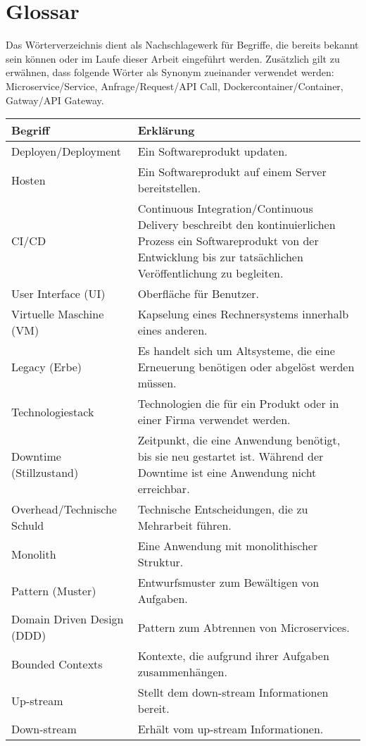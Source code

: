 \section{Glossar}

Das Wörterverzeichnis dient als Nachschlagewerk für Begriffe, die bereits bekannt sein können oder im Laufe dieser Arbeit eingeführt werden. Zusätzlich gilt zu erwähnen, dass folgende Wörter als Synonym zueinander verwendet werden: Microservice/Service, Anfrage/Request/API Call, Dockercontainer/Container, Gatway/API Gateway. 

\begin{longtable}{lp{10cm}}
	Begriff & Erklärung \\ \hline
	Deployen/Deployment & Ein Softwareprodukt updaten.  \\
	Hosten & Ein Softwareprodukt auf einem Server bereitstellen. \\
	CI/CD & Continuous Integration/Continuous Delivery beschreibt den kontinuierlichen Prozess ein Softwareprodukt von der Entwicklung bis zur tatsächlichen Veröffentlichung zu begleiten.\\
	User Interface (UI)  & Oberfläche für Benutzer.  \\
	Virtuelle Maschine (VM) & Kapselung eines Rechnersystems innerhalb eines anderen.  \\
	Legacy (Erbe) & Es handelt sich um Altsysteme, die eine Erneuerung benötigen oder abgelöst werden müssen. \\
	Technologiestack & Technologien die für ein Produkt oder in einer Firma verwendet werden.  \\
	Downtime (Stillzustand) & Zeitpunkt, die eine Anwendung benötigt, bis sie neu gestartet ist. Während der Downtime ist eine Anwendung nicht erreichbar.  \\
	Overhead/Technische Schuld & Technische Entscheidungen, die zu Mehrarbeit führen. \\
	Monolith & Eine Anwendung mit monolithischer Struktur. \\ 
	Pattern (Muster) & Entwurfsmuster zum Bewältigen von Aufgaben.\\
	Domain Driven Design (DDD) & Pattern zum Abtrennen von Microservices.\\ 
	Bounded Contexts & Kontexte, die aufgrund ihrer Aufgaben zusammenhängen. \\
	Up-stream & Stellt dem down-stream Informationen bereit. \\
	Down-stream & Erhält vom up-stream Informationen.\\

\end{longtable}
